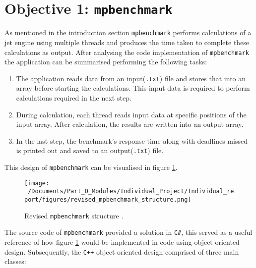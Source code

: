 \section{Objective 1: \texttt{mpbenchmark}}
As mentioned in the introduction section \texttt{mpbenchmark} performs calculations of a jet engine using multiple threads and produces the time taken to complete these calculations as output. After analysing the code implementation of \texttt{mpbenchmark} the application can be summarised performing the following tasks:

\begin{enumerate}
	\item The application reads data from an input(\texttt{.txt}) file and stores that into an array before starting the calculations. This input data is required to perform calculations required in the next step. 
	\item During calculation, each thread reads input data at specific positions of the input array. After calculation, the results are written into an output array.
	\item In the last step, the benchmark’s response time along with deadlines missed is printed out and saved to an output(\texttt{.txt}) file. 
\end{enumerate}

This design of \texttt{mpbenchmark} can be visualised in figure \ref*{fig:revised_mpbenchmark_structure}.

\begin{figure}[htbp] %
	\centering
	\texttt{[image: ~/Documents/Part\_D\_Modules/Individual\_Project/Individual\_report/figures/revised\_mpbenchmark\_structure.png]} %
	\caption{Revised \texttt{mpbenchmark} structure \cite{mpbenchmark_paper}.}
	\label{fig:revised_mpbenchmark_structure} %
\end{figure}

The source code of \texttt{mpbenchmark} provided a solution in \texttt{C\#}, this served as a useful reference of how figure \ref*{fig:revised_mpbenchmark_structure} would be implemented in code using object-oriented design. Subsequently, the \texttt{C++} object oriented design comprised of three main classes:

